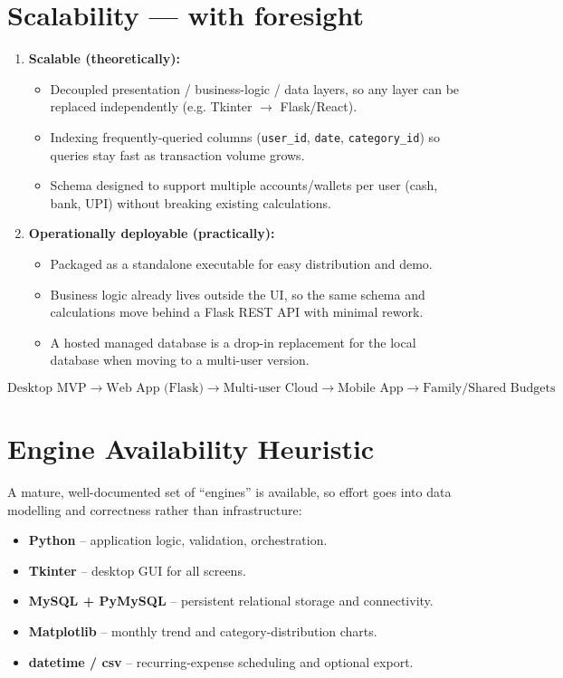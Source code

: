 \documentclass{article}
\begin{document}
\section{Scalability --- with foresight}
\begin{enumerate}[noitemsep]
  \item \textbf{Scalable (theoretically):}
  \begin{itemize}[noitemsep]
    \item Decoupled presentation / business-logic / data layers, so any layer can be replaced independently (e.g. Tkinter $\rightarrow$ Flask/React).
    \item Indexing frequently-queried columns (\texttt{user\_id}, \texttt{date}, \texttt{category\_id}) so queries stay fast as transaction volume grows.
    \item Schema designed to support multiple accounts/wallets per user (cash, bank, UPI) without breaking existing calculations.
  \end{itemize}
  \item \textbf{Operationally deployable (practically):}
  \begin{itemize}[noitemsep]
    \item Packaged as a standalone executable for easy distribution and demo.
    \item Business logic already lives outside the UI, so the same schema and calculations move behind a Flask REST API with minimal rework.
    \item A hosted managed database is a drop-in replacement for the local database when moving to a multi-user version.
  \end{itemize}
\end{enumerate}
\[
\text{Desktop MVP} \rightarrow \text{Web App (Flask)} \rightarrow \text{Multi-user Cloud} \rightarrow \text{Mobile App} \rightarrow \text{Family/Shared Budgets}
\]

\section{Engine Availability Heuristic}
A mature, well-documented set of ``engines'' is available, so effort goes into data modelling and correctness rather than infrastructure:
\begin{itemize}[noitemsep]
  \item \textbf{Python} -- application logic, validation, orchestration.
  \item \textbf{Tkinter} -- desktop GUI for all screens.
  \item \textbf{MySQL + PyMySQL} -- persistent relational storage and connectivity.
  \item \textbf{Matplotlib} -- monthly trend and category-distribution charts.
  \item \textbf{datetime / csv} -- recurring-expense scheduling and optional export.
\end{itemize}
\end{document}
